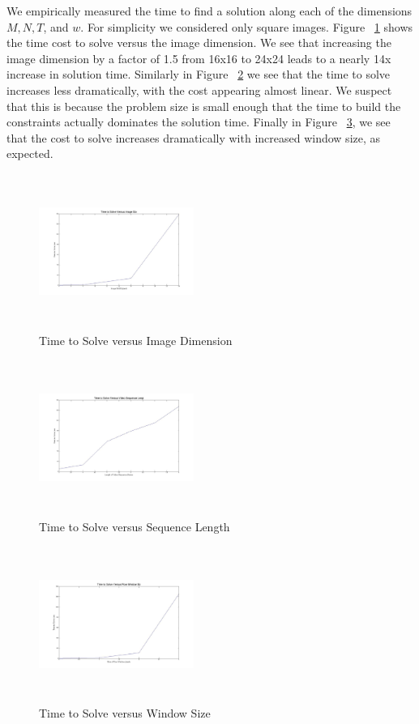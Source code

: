 We empirically measured the time to find a solution along each of the dimensions $M, N, T$, and $w$. For simplicity we considered only square images. Figure ~\ref{fig:TimeVsIm} shows the time cost to solve versus the image dimension. We see that increasing the image dimension by a factor of 1.5 from 16x16 to 24x24 leads to a nearly 14x increase in solution time. Similarly in Figure ~\ref{fig:TimeVsLength} we see that the time to solve increases less dramatically, with the cost appearing almost linear. We suspect that this is because the problem size is small enough that the time to build the constraints actually dominates the solution time. Finally in Figure ~\ref{fig:TimeVsWin}, we see that the cost to solve increases dramatically with increased window size, as expected.

\begin{figure}[h]
\begin{center}
	\includegraphics[width=0.45\textwidth, height=2in]{figures/time_vs_imsize.jpg}
	\caption{Time to Solve versus Image Dimension}
	\label{fig:TimeVsIm}
\end{center}
\end{figure}

\begin{figure}[h]
\begin{center}
	\includegraphics[width=0.45\textwidth, height=2in]{figures/time_vs_length.jpg}
	\caption{Time to Solve versus Sequence Length}
	\label{fig:TimeVsLength}
\end{center}
\end{figure}

\begin{figure}[h]
\begin{center}
	\includegraphics[width=0.45\textwidth, height=2in]{figures/time_vs_window.jpg}
	\caption{Time to Solve versus Window Size}
	\label{fig:TimeVsWin}
\end{center}
\end{figure}